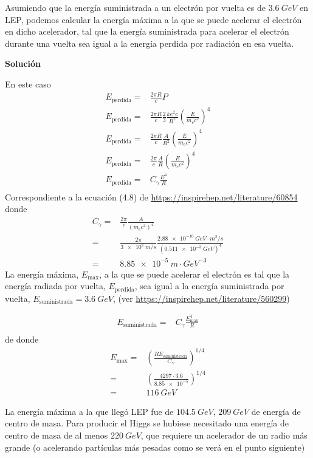 \documentclass[11pt,a4paper]{book}
\begin{document}
Asumiendo que la energía suministrada a un electrón por vuelta es de $\qty{3.6}{GeV}$ en LEP, podemos calcular la energía máxima a la que se puede acelerar el electrón en dicho acelerador, tal que la energía suministrada para acelerar el electrón durante una vuelta sea igual a la energía perdida por radiación en esa vuelta.

\textbf{Solución}

En este caso
\begin{align*}
    E_{\text{perdida}}  = &\frac{2\pi R}{c} P\\
   E_{\text{perdida}} =&\frac{2\pi R}{c} \frac{2}{3} \frac{k e^2 c}{R^2}\left(\frac{E}{m_ec^2}\right)^4\\
   E_{\text{perdida}} =&\frac{2\pi R}{c} \frac{A}{R^2}\left(\frac{E}{m_ec^2}\right)^4\\
   E_{\text{perdida}} =&\frac{2\pi}{c} \frac{A}{R}\left(\frac{E}{m_ec^2}\right)^4\\
   E_{\text{perdida}} =&C_\gamma \frac{E^4}{R}\\
   \end{align*}
Correspondiente a la ecuación (4.8) de \url{https://inspirehep.net/literature/60854}
donde 
\begin{align}
    C_\gamma =& \frac{2\pi}{c}\frac{A}{\left(m_e c^2\right)^4}\nonumber\\
    =& \frac{2\pi}{\qty{3e8}{m/s}}\frac{\qty{2.88e-10}{GeV\cdot m^2/s}}{(\qty{0.511e-3}{GeV})^4}\\
    =&\qty{8.85e-5}{m\cdot GeV^{-3}}
\end{align}
La energía máxima, $E_{\text{max}}$,  a la que se puede acelerar el electrón es tal que la energía radiada por vuelta, $E_{\text{perdida}}$, sea igual a la energía suministrada por vuelta, $E_{\text{suministrada}}=\qty{3.6}{GeV}$, (ver \url{https://inspirehep.net/literature/560299})

\begin{align*}
    E_{\text{suministrada}} =&C_\gamma \frac{E_{\text{max}}^4}{R}\\
\end{align*}
de donde
\begin{align*}
    E_{\text{max}} =&\left( \frac{R E_{\text{suministrada}} }{C_\gamma}\right)^{1/4}\\
    =&\left(\frac{4297\cdot 3.6}{\num{8.85e-5}}\right)^{1/4}\\
    =&\qty{116}{GeV}
\end{align*}

La energía máxima a la que llegó LEP fue de $\qty{104.5}{GeV}$, $\qty{209}{GeV}$ de energía de centro de masa. Para producir el Higgs se hubiese necesitado una energía de centro de masa de al menos $\qty{220}{GeV}$, que requiere un acelerador de un radio más grande (o acelerando  partículas más pesadas como se verá en el punto siguiente)
\end{document}
